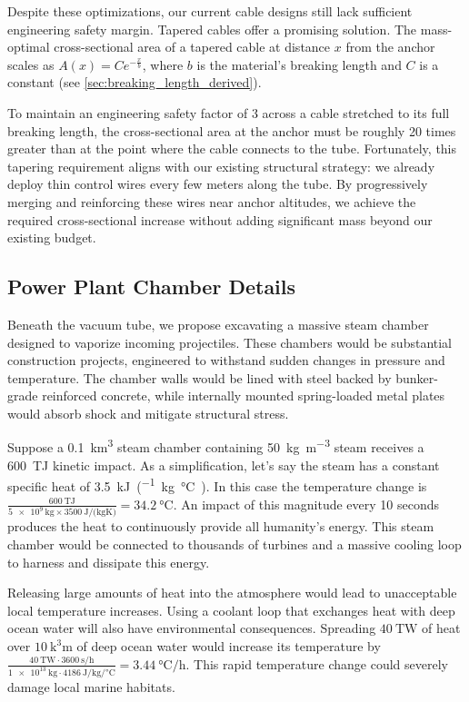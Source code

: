 \documentclass{article}
\begin{document}
Despite these optimizations, our current cable designs still lack sufficient engineering safety margin. Tapered cables offer a promising solution. The mass-optimal cross-sectional area of a tapered cable at distance $x$ from the anchor scales as $A(x) = C e^{-\frac{x}{b}}$, where $b$ is the material’s breaking length and $C$ is a constant (see \autoref{sec:breaking_length_derived}). 

To maintain an engineering safety factor of 3 across a cable stretched to its full breaking length, the cross-sectional area at the anchor must be roughly 20 times greater than at the point where the cable connects to the tube. Fortunately, this tapering requirement aligns with our existing structural strategy: we already deploy thin control wires every few meters along the tube. By progressively merging and reinforcing these wires near anchor altitudes, we achieve the required cross-sectional increase without adding significant mass beyond our existing budget.



\subsection{Power Plant Chamber Details}
Beneath the vacuum tube, we propose excavating a massive steam chamber designed to vaporize incoming projectiles. These chambers would be substantial construction projects, engineered to withstand sudden changes in pressure and temperature.  The chamber walls would be lined  with steel backed by bunker-grade reinforced concrete, while internally mounted spring-loaded metal plates would absorb shock and mitigate structural stress.  

Suppose a \SI{0.1}{\cubic\kilo\meter} steam chamber containing \SI{50}{\kilo\gram\per\cubic\meter} steam receives a \SI{600}{\tera\joule} kinetic impact.   As a simplification, let's say the steam has a constant specific heat of \SI{3.5}{\kilo\joule\per(\kilo\gram\celsius)}.  In this case the temperature change is 
$\frac{\SI{600}{\tera\joule}}{\SI{5e9}{\kilo\gram}\times\SI{3500}{\joule\per(\kilo\gram\kelvin)}} = \SI{34.2}{\celsius}$.  An impact of this magnitude every 10 seconds produces the heat to continuously provide all humanity's energy.  This steam chamber would be connected to thousands of turbines and a massive cooling loop to harness and dissipate this energy.  

Releasing large amounts of heat into the atmosphere would lead to unacceptable local temperature increases. Using a coolant loop that exchanges heat with deep ocean water will also have environmental consequences. Spreading $\SI{40}{\tera\watt}$ of heat over $\SI{10}{\cubic\kilo\meter}$ of deep ocean water would increase its temperature by $\frac{\SI{40}{\tera\watt}\cdot\SI{3600}{\second\per\hour}}{\SI{1e13}{\kilo\gram}\cdot\SI{4186}{\joule\per\kilo\gram\per\celsius}} = \SI{3.44}{\celsius\per\hour}$.  This rapid temperature change could severely damage local marine habitats.
\end{document}
